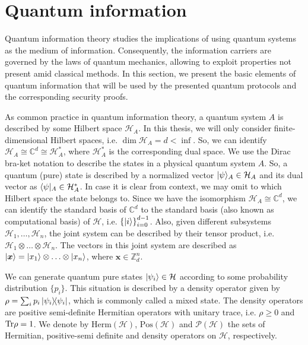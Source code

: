 \section{Quantum information}

Quantum information theory studies the implications of using quantum systems as the medium of information. Consequently, the information carriers are governed by the laws of quantum mechanics, allowing to exploit properties not present amid classical methods. In this section, we present the basic elements of quantum information that will be used by the presented quantum protocols and the corresponding security proofs.

As common practice in quantum information theory, a quantum system $A$ is described by some Hilbert space $\mathcal{H}_A$. In this thesis, we will only consider finite-dimensional Hilbert spaces, i.e. $\dim \mathcal{H}_A = d < \inf$. So, we can identify $\mathcal{H}_A \cong \mathbb{C}^d \cong \mathcal{H}^{*}_A$, where $\mathcal{H}^{*}_A$ is the corresponding dual space. We use the Dirac bra-ket notation to describe the states in a physical quantum system $A$. So, a quantum (pure) state is described by a normalized vector $| \psi \rangle_A\in\mathcal{H}_A$ and its dual vector as $\langle \psi |_A\in\mathcal{H}^{*}_A$. In case it is clear from context, we may omit to which Hilbert space the state belongs to. Since we have the isomorphism $\mathcal{H}_A \cong \mathbb{C}^d$, we can identify the standard basis of $\mathbb{C}^d$ to the standard basis (also known as computational basis) of $\mathcal{H}$, i.e. $\left\{ | i \rangle \right\}_{i=0}^{d-1}$. Also, given different subsystems $\mathcal{H}_1, \ldots, \mathcal{H}_n$, the joint system can be described by their tensor product, i.e. $\mathcal{H}_1 \otimes \ldots \otimes \mathcal{H}_n$. The vectors in this joint system are described as $| \bm{x} \rangle = | x_1 \rangle \otimes \ldots \otimes | x_n \rangle$, where $\bm{x} \in \mathbb{Z}_d^n$.

We can generate quantum pure states $| \psi_i \rangle\in \mathcal{H}$ according to some probability distribution $\{p_i\}$. This situation is described by a density operator given by $\rho = \sum_i p_i \ketbra{\psi_i}$, which is commonly called a mixed state. The density operators are positive semi-definite Hermitian operators with unitary trace, i.e. $\rho \geq 0$ and $\text{Tr} \rho = 1$. We denote by $\text{Herm}(\mathcal{H})$, $\text{Pos}(\mathcal{H})$  and $\mathcal{P}(\mathcal{H})$ the sets of Hermitian, positive-semi definite and density operators on $\mathcal{H}$, respectively.

